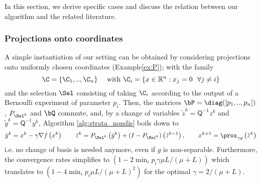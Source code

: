 In this section, we derive specific cases and discuss the relation between our algorithm and the related literature.
 

\subsubsection{Projections onto coordinates} \label{sec:coordproj}

A simple instantiation of our setting can be obtained by considering projections onto uniformly chosen coordinates (Example\;\ref{ex:P}); with 
the family 
$$ \C = \{\C_1,..,\C_n\} \quad\text{ with } \C_i = \{x\in\mathbb{R}^n  : x_j = 0 ~~ \forall j \neq i \} $$ 
and the selection $\Sel$ consisting {of} taking $\C_i$ according to the output of a Bernoulli experiment of parameter $p_i$. Then, the matrices $\bP = \diag( [p_1,..,p_n])$, $P_{\Sel^k}$ and $\bQ$ commute, {and, by a change of variables $\tilde{z}^k = \mathsf{Q}^{-1} z^k$ and $\tilde{y}^k  = \mathsf{Q}^{-1} y^k$, } Algorithm \ref{alg:strata_nondis} boils down to
{
\[
\tilde{y}^k = x^k - \gamma\nabla f\left(x^k\right)\qquad
\tilde{z}^{k} =  P_{\Sel^k}\left(\tilde{y}^k\right) + (I- P_{\Sel^k})\left(\tilde{z}^{k-1}\right),\qquad
x^{k+1}  = \prox_{\gamma g} \left(\tilde{z}^{k}\right)
 \]}
i.e. no change of basis is needed anymore, even if $g$ is non-separable. Furthermore, the convergence rates simplifies to $(1- 2 \min_i p_i  \gamma \mu L/(\mu + L))$ which translates to $(1- 4 \min_i p_i\mu L/(\mu + L)^2)$ for the optimal $\gamma = 2/(\mu+L)$.

